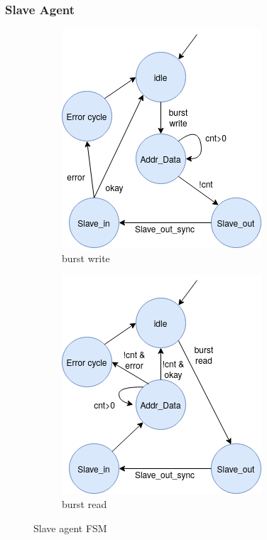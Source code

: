 \subsubsection{Slave Agent}
\begin{figure}[hbt]
 \centering
 \begin{subfigure}[b]{0.4\linewidth}
 \includegraphics[width=0.7\linewidth]{figs/hw/sAgent_wburstfsm.png}
 \caption{burst write}
 \end{subfigure}
 \begin{subfigure}[b]{0.4\linewidth}
 \includegraphics[width=0.7\linewidth]{figs/hw/sAgent_rburstfsm.png}
 \caption{burst read}
 \end{subfigure}
\caption{Slave agent FSM}
\label{fig:sagt-burstfsm}
\end{figure}

